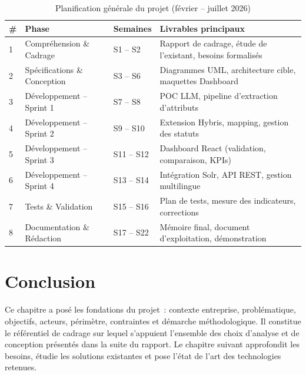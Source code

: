 \begin{table}[H]
  \centering
  \caption{Planification générale du projet (février -- juillet 2026)}
  \label{tab:planning}
  \begin{tabular}{|p{0.5cm}|p{3.5cm}|p{2.5cm}|p{6.5cm}|}
    \hline
    \textbf{\#} & \textbf{Phase} & \textbf{Semaines} & \textbf{Livrables principaux} \\
    \hline
    1 & Compréhension \& Cadrage & S1 -- S2 & Rapport de cadrage, étude de l'existant, besoins formalisés \\
    \hline
    2 & Spécifications \& Conception & S3 -- S6 & Diagrammes UML, architecture cible, maquettes Dashboard \\
    \hline
    3 & Développement -- Sprint 1 & S7 -- S8 & POC LLM, pipeline d'extraction d'attributs \\
    \hline
    4 & Développement -- Sprint 2 & S9 -- S10 & Extension Hybris, mapping, gestion des statuts \\
    \hline
    5 & Développement -- Sprint 3 & S11 -- S12 & Dashboard React (validation, comparaison, KPIs) \\
    \hline
    6 & Développement -- Sprint 4 & S13 -- S14 & Intégration Solr, API REST, gestion multilingue \\
    \hline
    7 & Tests \& Validation & S15 -- S16 & Plan de tests, mesure des indicateurs, corrections \\
    \hline
    8 & Documentation \& Rédaction & S17 -- S22 & Mémoire final, document d'exploitation, démonstration \\
    \hline
  \end{tabular}
\end{table}

\section{Conclusion}
Ce chapitre a posé les fondations du projet~: contexte entreprise, problématique, objectifs, acteurs, périmètre, contraintes et démarche méthodologique. Il constitue le référentiel de cadrage sur lequel s'appuient l'ensemble des choix d'analyse et de conception présentés dans la suite du rapport. Le chapitre suivant approfondit les besoins, étudie les solutions existantes et pose l'état de l'art des technologies retenues.